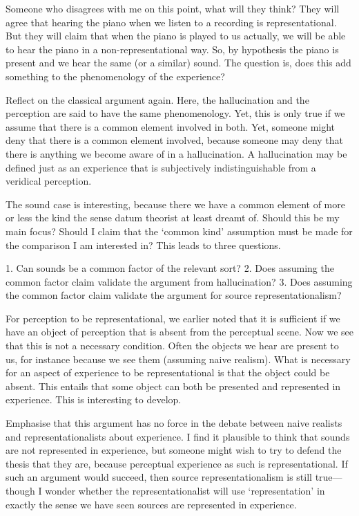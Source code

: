 \documentclass[sloppy, journal, git, bytitle, dodraft]{humapap}
\begin{document}
Someone who disagrees with me on this point, what will they think? They will agree that hearing the piano when we listen to a recording is representational. But they will claim that when the piano is played to us actually, we will be able to hear the piano in a non-representational way. So, by hypothesis the piano is present and we hear the same (or a similar) sound. The question is, does this add something to the phenomenology of the experience? 

Reflect on the classical argument again. Here, the hallucination and the perception are said to have the same phenomenology. Yet, this is only true if we assume that there is a common element involved in both. Yet, someone might deny that there is a common element involved, because someone may deny that there is anything we become aware of in a hallucination. A hallucination may be defined just as an experience that is subjectively indistinguishable from a veridical perception. 

The sound case is interesting, because there we have a common element of more or less the kind the sense datum theorist at least dreamt of. Should this be my main focus? Should I claim that the `common kind' assumption must be made for the comparison I am interested in? This leads to three questions. 

1. Can sounds be a common factor of the relevant sort?
2. Does assuming the common factor claim validate the argument from hallucination? 
3. Does assuming the common factor claim validate the argument for source representationalism? 


\sect

For perception to be representational, we earlier noted that it is sufficient if we have an object of perception that is absent from the perceptual scene. Now we see that this is not a necessary condition. Often the objects we hear are present to us, for instance because we see them (assuming naive realism). What is necessary for an aspect of experience to be representational is that the object could be absent. This entails that some object can both be presented and represented in experience. This is interesting to develop.

Emphasise that this argument has no force in the debate between naive realists and representationalists about experience. I find it plausible to think that sounds are not represented in experience, but someone might wish to try to defend the thesis that they are, because perceptual experience as such is representational. If such an argument would succeed, then source representationalism is still true---though I wonder whether the representationalist will use `representation' in exactly the sense we have seen sources are represented in experience. 
\end{document}
